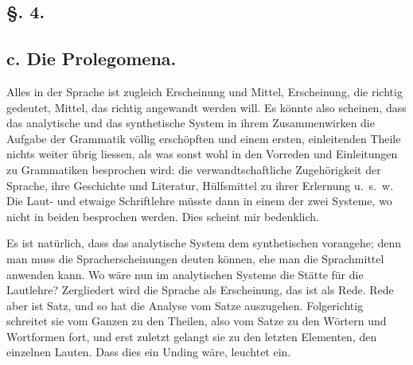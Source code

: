 \subsection*{§. 4.}\label{II.VI.4}
\subsection*{c. Die Prolegomena.}

Alles in der Sprache ist zugleich Erscheinung und Mittel, Erscheinung, die richtig gedeutet, Mittel, das richtig angewandt werden will. Es könnte also scheinen, dass das analytische und das synthetische System in ihrem Zusammenwirken die Aufgabe der Grammatik völlig erschöpften und einem ersten, einleitenden Theile nichts weiter übrig liessen, als was sonst wohl in den Vorreden und Einleitungen zu Grammatiken besprochen wird: die verwandtschaftliche Zugehörigkeit der Sprache, ihre Geschichte und Literatur, Hülfsmittel zu ihrer Erlernung u.~s.~w. Die Laut- und etwaige Schriftlehre müsste dann in einem der zwei Systeme, wo nicht in beiden besprochen werden. Dies scheint mir bedenklich.

\largerpage[1]Es ist natürlich, dass das analytische System dem synthetischen vorangehe; denn man muss die Spracherscheinungen deuten können, ehe man die Sprachmittel anwenden kann. Wo wäre nun im analytischen Systeme die Stätte für die Lautlehre? Zergliedert wird die Sprache als Erscheinung, das ist als Rede. Rede aber ist Satz, und so hat die Analyse vom Satze auszugehen. Folgerichtig schreitet sie vom Ganzen zu den Theilen, also vom Satze zu den Wörtern und Wortformen fort, und erst zuletzt gelangt sie zu den letzten Elementen, den einzelnen Lauten. Dass dies ein Unding wäre, leuchtet ein.

\label{sp.87}

